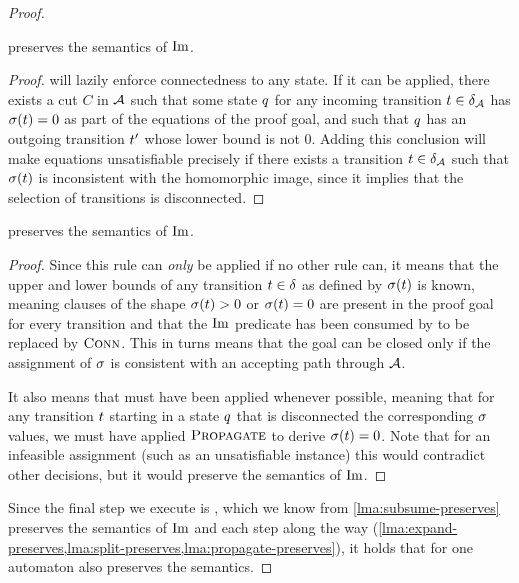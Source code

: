 \documentclass[acmsmall,review,anonymous,screen]{acmart}\settopmatter{printfolios=true,printccs=false,printacmref=true}
\theoremstyle{definition}
\begin{document}
\begin{proof}
\begin{lemma}\label{lma:propagate-preserves}
  \Propagate{} preserves the semantics of $\operatorname{Im}$.
\end{lemma}
\begin{proof}
  \Propagate{} will lazily enforce connectedness to any state. If it can be
  applied, there exists a cut $C$ in $\mathcal{A}$ such that some state $q$
  for any incoming transition $t \in \delta_{\mathcal{A}}$ has
  $\operatorname{\sigma}(t) = 0$  as part of the equations of the proof goal, and such that
  $q$ has an outgoing transition $t'$ whose lower bound is not
  $0$. Adding this conclusion will make equations unsatisfiable precisely if
  there exists a transition $t \in \delta_{\mathcal{A}}$ such that
  $\operatorname{\sigma}(t)$ is inconsistent with the homomorphic image, since it
  implies that the selection of transitions is disconnected.
\end{proof}

\begin{lemma}\label{lma:subsume-preserves}
  \Subsume{} preserves the semantics of $\operatorname{Im}$.
\end{lemma}
\begin{proof}
  Since this rule can \emph{only} be applied if no other rule can, it means that
  the upper and lower bounds of any transition $t \in \delta$ as
  defined by $\operatorname{\sigma}(t)$ is known, meaning clauses of the shape
  $\operatorname{\sigma}(t) > 0$ or $\operatorname{\sigma}(t) = 0$ are present in the
  proof goal for every transition and that the $\operatorname{Im}$ predicate has been
  consumed by \Expand{} to be replaced by $\operatorname{\textsc{Conn}}$. This in turns means that
  the goal can be closed only if the assignment of $\operatorname{\sigma}$ is consistent with
  an accepting path through $\mathcal{A}$.
  
  It also means that \Propagate{} must have been applied whenever possible, meaning that for any transition $t$ starting in a state $q$ that is disconnected the corresponding $\operatorname{\sigma}$ values, we must have applied $\textsc{Propagate}{}$ to derive $\operatorname{\sigma}(t) = 0$. Note that for an infeasible assignment (such as an unsatisfiable instance) this would contradict other decisions, but it would preserve the semantics of $\operatorname{Im}$.
\end{proof}

Since the final step we execute is \Subsume, which we know from
\cref{lma:subsume-preserves} preserves the semantics of $\operatorname{Im}$ and each step
along the way
(\cref{lma:expand-preserves,lma:split-preserves,lma:propagate-preserves}), it
holds that \Calculus{} for one automaton also preserves the semantics.
\end{proof}
\end{document}
